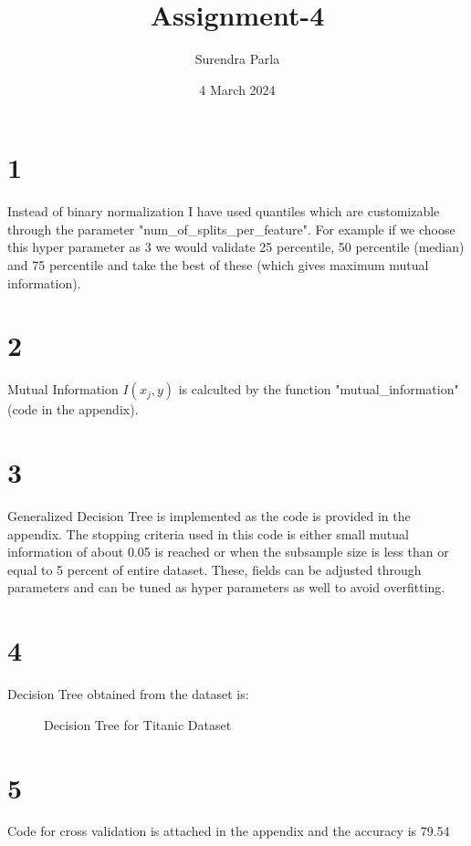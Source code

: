 \documentclass{article}
\title{Assignment-4}
\author{Surendra Parla}
\date{4 March 2024}
\begin{document}
\maketitle

\section{1}
Instead of binary normalization I have used quantiles which are customizable through the parameter "num\_of\_splits\_per\_feature". For example if we choose this hyper parameter as 3 we would validate 25 percentile, 50 percentile (median) and 75 percentile and take the best of these (which gives maximum mutual information).
\section{2}
Mutual Information $I(x_j, y)$ is calculted by the function "mutual\_information" (code in the appendix).
\section{3}
Generalized Decision Tree is implemented as the code is provided in the appendix.
The stopping criteria used in this code is either small mutual information of about 0.05 is reached or when the subsample size is less than or equal to 5 percent of entire dataset. These, fields can be adjusted through parameters and can be tuned as hyper parameters as well to avoid overfitting.
\section{4}
Decision Tree obtained from the dataset is:
\begin{figure}
    \caption{Decision Tree for Titanic Dataset}
\end{figure}
\section{5}
Code for cross validation is attached in the appendix and the accuracy is 79.54
\end{document}
